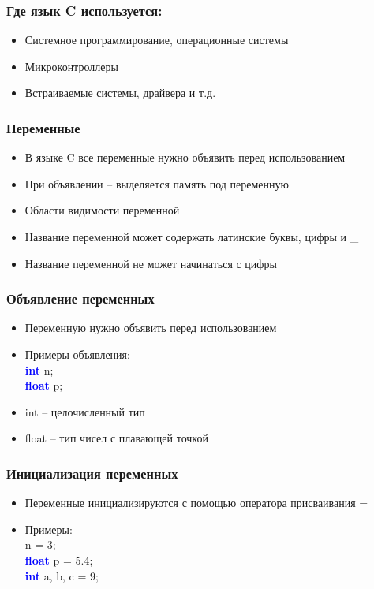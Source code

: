 \documentclass[12pt,pdf,hyperref={unicode}]{beamer}
\begin{document}
\begin{frame}
\frametitle{Где язык C используется:} 
\begin{center}
\begin{itemize}
\item Системное программирование, операционные системы
\item Микроконтроллеры
\item Встраиваемые системы, драйвера и т.д.
\end{itemize}
\end{center}
\end{frame}

\begin{frame}
\frametitle{Переменные} 
\begin{center}
\begin{itemize}
\item В языке C все переменные нужно объявить перед использованием
\item При объявлении -- выделяется память под переменную
\item Области видимости переменной
\item Название переменной может содержать латинские буквы, цифры и \_
\item Название переменной не может начинаться с цифры
\end{itemize}
\end{center}
\end{frame}


\begin{frame}
\frametitle{Объявление переменных} 
\begin{center}
\begin{itemize}
\item Переменную нужно объявить перед использованием
\item Примеры объявления:\\
\textcolor{blue}{\textbf{int}} n;\\
\textcolor{blue}{\textbf{float}} p;
\item int -- целочисленный тип \\
\item float -- тип чисел с плавающей точкой
\end{itemize}
\end{center}
\end{frame}

\begin{frame}
\frametitle{Инициализация переменных} 
\begin{center}
\begin{itemize}
\item Переменные инициализируются с помощью оператора присваивания =
\item Примеры:\\
n = 3; \\
\textcolor{blue}{\textbf{float}} p = 5.4; \\
\textcolor{blue}{\textbf{int}} a, b, c = 9;
\end{itemize}
\end{center}
\end{frame}
\end{document}
